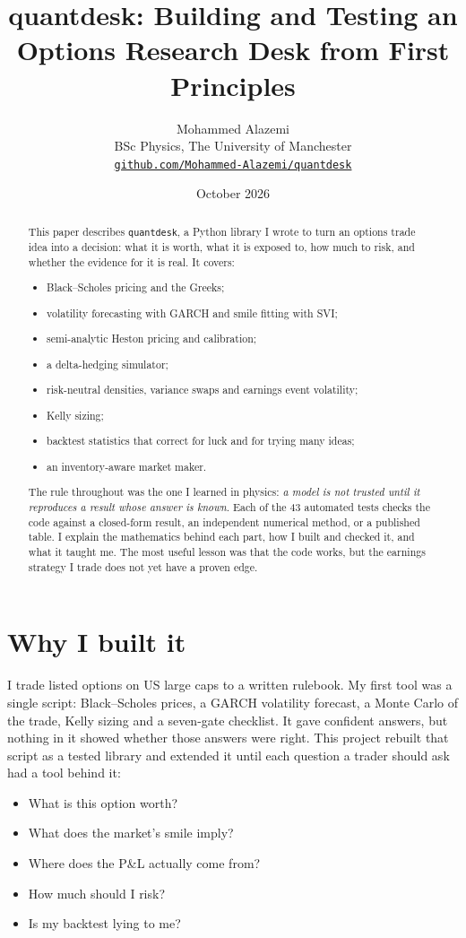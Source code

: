 \documentclass[11pt,a4paper]{article}
\title{\textbf{quantdesk: Building and Testing an\\Options Research Desk from First Principles}}
\author{Mohammed Alazemi\\[2pt]\small BSc Physics, The University of Manchester\\
\small\href{https://github.com/Mohammed-Alazemi/quantdesk}{\texttt{github.com/Mohammed-Alazemi/quantdesk}}}
\date{\small October 2026}
\begin{document}
\maketitle

\begin{abstract}
\noindent
This paper describes \texttt{quantdesk}, a Python library I wrote to turn an options trade idea into a decision: what it is worth, what it is exposed to, how much to risk, and whether the evidence for it is real. It covers:
\begin{itemize}[leftmargin=1.5em]
  \item Black--Scholes pricing and the Greeks;
  \item volatility forecasting with GARCH and smile fitting with SVI;
  \item semi-analytic Heston pricing and calibration;
  \item a delta-hedging simulator;
  \item risk-neutral densities, variance swaps and earnings event volatility;
  \item Kelly sizing;
  \item backtest statistics that correct for luck and for trying many ideas;
  \item an inventory-aware market maker.
\end{itemize}
The rule throughout was the one I learned in physics: \emph{a model is not trusted until it reproduces a result whose answer is known}. Each of the 43 automated tests checks the code against a closed-form result, an independent numerical method, or a published table. I explain the mathematics behind each part, how I built and checked it, and what it taught me. The most useful lesson was that the code works, but the earnings strategy I trade does not yet have a proven edge.
\end{abstract}

\section{Why I built it}
I trade listed options on US large caps to a written rulebook. My first tool was a single script: Black--Scholes prices, a GARCH volatility forecast, a Monte Carlo of the trade, Kelly sizing and a seven-gate checklist. It gave confident answers, but nothing in it showed whether those answers were right. This project rebuilt that script as a tested library and extended it until each question a trader should ask had a tool behind it:
\begin{itemize}[leftmargin=1.5em]
  \item What is this option worth?
  \item What does the market's smile imply?
  \item Where does the P\&L actually come from?
  \item How much should I risk?
  \item Is my backtest lying to me?
\end{itemize}
\end{document}
